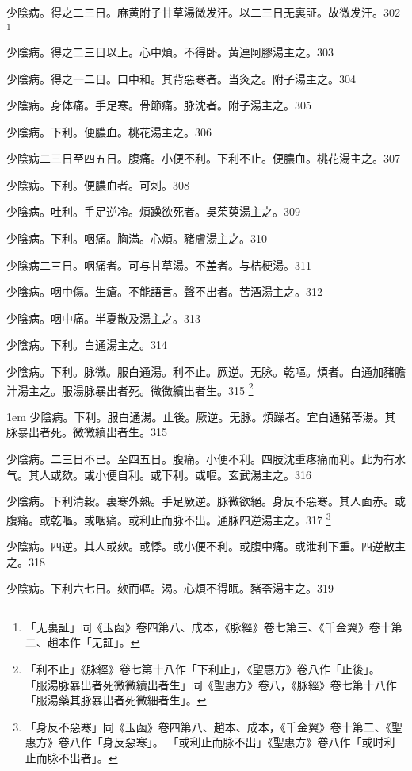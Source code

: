 少陰病。得之二三日。麻黄附子甘草湯微发汗。以二三日无{\khaai 裏}証。故微发汗。302
	\footnote{
		「无裏証」同《玉函》卷四第八、成本，《脉經》卷七第三、《千金翼》卷十第二、趙本作「无証」。
	}

少陰病。得之二三日以上。心中煩。不得卧。黄連阿膠湯主之。303

少陰病。得之一二日。口中和。其背惡寒者。当灸之。附子湯主之。304

少陰病。身体痛。手足寒。骨節痛。脉沈者。附子湯主之。305

少陰病。下利。便膿血。桃花湯主之。306

少陰病二三日至四五日。腹痛。小便不利。下利不止。便膿血。桃花湯主之。307

少陰病。下利。便膿血者。可刺。308

少陰病。吐利。手足逆{\khaai 冷}。煩躁欲死者。吳茱萸湯主之。309

少陰病。下利。咽痛。胸滿。心煩。豬膚湯主之。310

少陰病二三日。咽痛者。可与甘草湯。不差者。与桔梗湯。311

少陰病。咽中傷。生瘡。不能語言。聲不出者。苦酒湯主之。312

少陰病。咽中痛。半夏散及湯主之。313

少陰病。下利。白通湯主之。314

少陰病。下利。脉微。服白通湯。利不止。厥逆。无脉。乾嘔。煩者。白通加豬膽汁湯主之。服湯脉暴出者死。微{\khaai 微}續{\khaai 出}者生。315
	\footnote{
		「利不止」《脉經》卷七第十八作「下利止」，《聖惠方》卷八作「止後」。
		「服湯脉暴出者死微微續出者生」同《聖惠方》卷八，《脉經》卷七第十八作「服湯藥其脉暴出者死微細者生」。
	}

\hangindent 1em
少陰病。下利。服白通湯。止後。厥逆。无脉。煩躁者。宜白通豬苓湯。其脉暴出者死。微微續出者生。{\shenghui}315

少陰病。二三日不已。至四五日。腹痛。小便不利。四肢沈重疼痛而利。此为有水气。其人或欬。或小便{\khaai 自}利。或下利。或嘔。玄武湯主之。316

少陰病。下利清穀。裏寒外熱。手足厥逆。脉微欲絕。身反不惡寒。其人面赤。或腹痛。或乾嘔。或咽痛。或利止{\khaai 而}脉不出。通脉四逆湯主之。317
	\footnote{
		「身反不惡寒」同《玉函》卷四第八、趙本、成本，《千金翼》卷十第二、《聖惠方》卷八作「身反惡寒」。
		「或利止而脉不出」《聖惠方》卷八作「或时利止而脉不出者」。
	}

少陰病。四逆。其人或欬。或悸。或小便不利。或腹中痛。或泄利下重。四逆散主之。318

少陰病。下利六七日。欬而嘔。渴。心煩不得眠。豬苓湯主之。319

